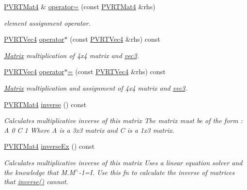 \begin{DoxyCompactItemize}
\hyperlink{struct_p_v_r_t_mat4}{P\+V\+R\+T\+Mat4} \& \hyperlink{struct_p_v_r_t_mat4_ae5a84554735e5e924f1b1c48dcaa87a9}{operator=} (const \hyperlink{struct_p_v_r_t_mat4}{P\+V\+R\+T\+Mat4} \&rhs)
\begin{DoxyCompactList}\small\item\em element assignment operator. \end{DoxyCompactList}\item 
\hyperlink{struct_p_v_r_t_vec4}{P\+V\+R\+T\+Vec4} \hyperlink{struct_p_v_r_t_mat4_aa7309eb8eac00878de8a10cfd400690a}{operator$\ast$} (const \hyperlink{struct_p_v_r_t_vec4}{P\+V\+R\+T\+Vec4} \&rhs) const 
\begin{DoxyCompactList}\small\item\em \hyperlink{class_matrix}{Matrix} multiplication of 4x4 matrix and \hyperlink{classvec3}{vec3}. \end{DoxyCompactList}\item 
\hyperlink{struct_p_v_r_t_vec4}{P\+V\+R\+T\+Vec4} \hyperlink{struct_p_v_r_t_mat4_a5428c34b936d5c8c07680448f35500e9}{operator$\ast$=} (const \hyperlink{struct_p_v_r_t_vec4}{P\+V\+R\+T\+Vec4} \&rhs) const 
\begin{DoxyCompactList}\small\item\em \hyperlink{class_matrix}{Matrix} multiplication and assignment of 4x4 matrix and \hyperlink{classvec3}{vec3}. \end{DoxyCompactList}\item 
\hyperlink{struct_p_v_r_t_mat4}{P\+V\+R\+T\+Mat4} \hyperlink{struct_p_v_r_t_mat4_a553c1f51db42d5fb3ef55557dfbad4e4}{inverse} () const 
\begin{DoxyCompactList}\small\item\em Calculates multiplicative inverse of this matrix The matrix must be of the form \+: A 0 C 1 Where A is a 3x3 matrix and C is a 1x3 matrix. \end{DoxyCompactList}\item 
\hyperlink{struct_p_v_r_t_mat4}{P\+V\+R\+T\+Mat4} \hyperlink{struct_p_v_r_t_mat4_a05c97718d88268d15151bd092dbc1cc1}{inverse\+Ex} () const 
\begin{DoxyCompactList}\small\item\em Calculates multiplicative inverse of this matrix Uses a linear equation solver and the knowledge that M.\+M$^\wedge$-\/1=I. Use this fn to calculate the inverse of matrices that \hyperlink{struct_p_v_r_t_mat4_a553c1f51db42d5fb3ef55557dfbad4e4}{inverse()} cannot. \end{DoxyCompactList}\item 

\end{DoxyCompactItemize}
